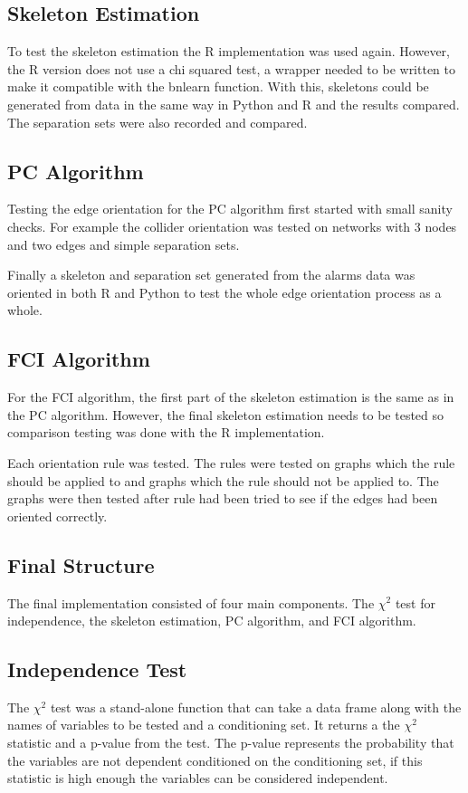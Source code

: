 \documentclass{UoYCSproject}
\begin{document}
\subsection{Skeleton Estimation}
To test the skeleton estimation the R implementation was used again. However, the R version does not use a chi squared test, a wrapper needed to be written to make it compatible with the bnlearn function. With this, skeletons could be generated from data in the same way in Python and R and the results compared. The separation sets were also recorded and compared.

\subsection{PC Algorithm}
Testing the edge orientation for the PC algorithm first started with small sanity checks. For example the collider orientation was tested on networks with 3 nodes and two edges and simple separation sets.

Finally a skeleton and separation set generated from the alarms data was oriented in both R and Python to test the whole edge orientation process as a whole.

\subsection{FCI Algorithm}
For the FCI algorithm, the first part of the skeleton estimation is the same as in the PC algorithm. However, the final skeleton estimation needs to be tested so comparison testing was done with the R implementation.

Each orientation rule was tested. The rules were tested on graphs which the rule should be applied to and graphs which the rule should not be applied to. The graphs were then tested after rule had been tried to see if the edges had been oriented correctly.

\subsection{Final Structure}
The final implementation consisted of four main components. The $\chi^2$ test for independence, the skeleton estimation, PC algorithm, and FCI algorithm.

\subsection{Independence Test}
The $\chi^2$ test was a stand-alone function that can take a data frame along with the names of variables to be tested and a conditioning set. It returns a the $\chi^2$ statistic and a p-value from the test. The p-value represents the probability that the variables are not dependent conditioned on the conditioning set, if this statistic is high enough the variables can be considered independent.
\end{document}
